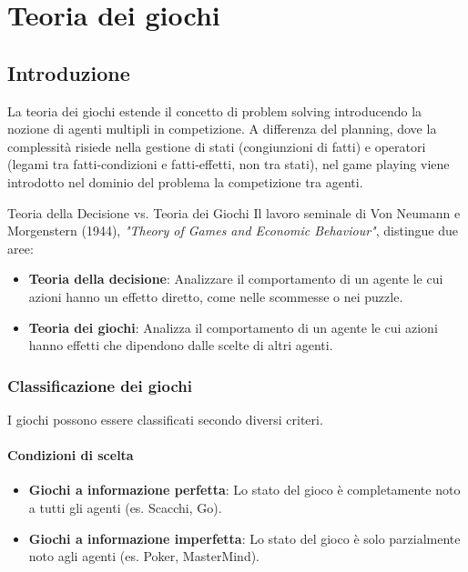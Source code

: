
\chapter{Teoria dei giochi}

\section{Introduzione}

La teoria dei giochi estende il concetto di problem solving
introducendo la nozione di agenti multipli in competizione.
A differenza del planning, dove la complessità risiede nella gestione di stati
(congiunzioni di fatti) e operatori (legami tra fatti-condizioni e
fatti-effetti, non tra stati), nel game playing viene introdotto nel dominio
del problema la competizione tra agenti.

\begin{nota}{Teoria della Decisione vs. Teoria dei Giochi}{}
    Il lavoro seminale di Von Neumann e Morgenstern (1944),
    \textit{"Theory of Games and Economic Behaviour"}, distingue due aree:
    \begin{itemize}
        \item \textbf{Teoria della decisione}: Analizzare il comportamento di
        un agente le cui azioni hanno un effetto diretto, come nelle scommesse
        o nei puzzle.
        \item \textbf{Teoria dei giochi}: Analizza il comportamento di un
        agente le cui azioni hanno effetti che dipendono dalle scelte di
        altri agenti.
    \end{itemize}
\end{nota}

\subsection{Classificazione dei giochi}

I giochi possono essere classificati secondo diversi criteri.

\subsubsection{Condizioni di scelta}
\begin{itemize}
    \item \textbf{Giochi a informazione perfetta}: Lo stato del gioco è
    completamente noto a tutti gli agenti (es. Scacchi, Go).
    \item \textbf{Giochi a informazione imperfetta}: Lo stato del gioco è solo
    parzialmente noto agli agenti (es. Poker, MasterMind).
\end{itemize}

